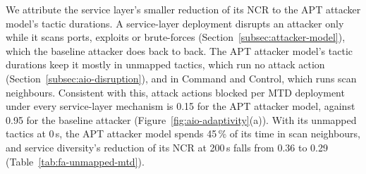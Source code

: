 \documentclass{cshonours}
\begin{document}
We attribute the service layer's smaller reduction of its NCR to the APT
attacker model's tactic durations. A service-layer deployment
disrupts an attacker only while it scans ports, exploits or brute-forces
(Section~\ref{subsec:attacker-model}), which the baseline attacker does back to
back. The APT attacker model's tactic durations keep it mostly in unmapped
tactics, which run no attack action (Section~\ref{subsec:aio-disruption}), and
in Command and Control, which runs scan neighbours. Consistent
with this, attack actions blocked per MTD deployment under every service-layer
mechanism is 0.15 for the APT attacker model,
against 0.95 for the baseline attacker (Figure~\ref{fig:aio-adaptivity}(a)).
With its unmapped tactics at 0\,s, the APT attacker model spends 45\,\% of its
time in scan neighbours, and service diversity's reduction of its NCR at
200\,s falls from 0.36 to 0.29 (Table~\ref{tab:fa-unmapped-mtd}).

\end{document}
